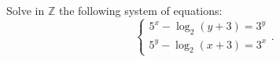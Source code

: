 Solve in $ \mathbb{Z} $ the following system of equations:
$$ \left\{\begin{matrix} 5^x-\log_2 (y+3) = 3^y\\ 5^y -\log_2 (x+3)=3^x\end{matrix}\right. . $$